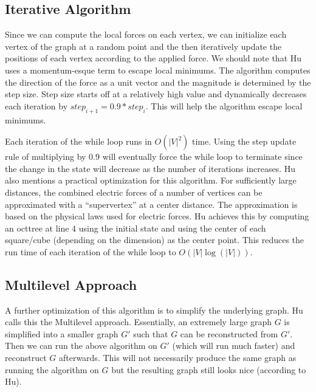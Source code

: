 \subsection{Iterative Algorithm}


Since we can compute the local forces on each vertex, we can initialize each vertex of the graph at a random point and the then iteratively update the positions of each vertex according to the applied force.
We should note that Hu uses a momentum-esque term to escape local minimums.
The algorithm computes the direction of the force as a unit vector and the magnitude is determined by the step size.
Step size starts off at a relatively high value and dynamically decreases each iteration by $step_{i+1} = 0.9 * step_i$.
This will help the algorithm escape local minimums.



Each iteration of the while loop runs in $O (|V|^2)$ time.
Using the step update rule of multiplying by 0.9 will eventually force the while loop to terminate since the change in the state will decrease as the number of iterations increases.
Hu also mentions a practical optimization for this algorithm.
For sufficiently large distances, the combined electric forces of a number of vertices can be approximated with a ``supervertex'' at a center distance.
The approximation is based on the physical laws used for electric forces.
Hu achieves this by computing an octtree at line 4 using the initial state and using the center of each square/cube (depending on the dimension) as the center point.
This reduces the run time of each iteration of the while loop to $O ( |V| \log (|V|))$.

\subsection{Multilevel Approach}

A further optimization of this algorithm is to simplify the underlying graph.
Hu calls this the Multilevel approach.
Essentially, an extremely large graph $G$ is simplified into a smaller graph $G'$ such that $G$ can be reconstructed from $G'$.
Then we can run the above algorithm on $G'$ (which will run much faster) and reconstruct $G$ afterwards.
This will not necessarily produce the same graph as running the algorithm on $G$ but the resulting graph still looks nice (according to Hu).

